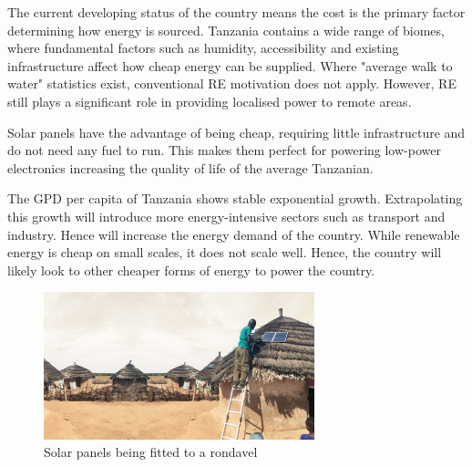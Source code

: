 The current developing status of the country means the cost is the primary factor determining how energy is sourced. Tanzania contains a wide range of biomes, where fundamental factors such as humidity, accessibility and existing infrastructure affect how cheap energy can be supplied. Where "average walk to water" statistics exist, conventional RE motivation does not apply. However, RE still plays a significant role in providing localised power to remote areas. 

Solar panels have the advantage of being cheap, requiring little infrastructure and do not need any fuel to run. This makes them perfect for powering low-power electronics increasing the quality of life of the average Tanzanian.

The GPD per capita of Tanzania shows stable exponential growth. Extrapolating this growth will introduce more energy-intensive sectors such as transport and industry. Hence will increase the energy demand of the country. While renewable energy is cheap on small scales, it does not scale well. Hence, the country will likely look to other cheaper forms of energy to power the country.  


\begin{figure}
    \includegraphics[width=0.7\textwidth]{IMG/solar-roof.jpg}
    \caption{Solar panels being fitted to a rondavel \cite{Cullmann2020Feb}}
    \end{figure}\label{fig:4_Review_3}
    

